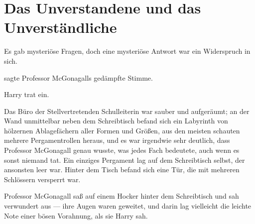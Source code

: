\chapter{Das Unverstandene und das Unverständliche}

\begin{chapterOpeningQuote}
Es gab mysteriöse Fragen, doch eine mysteriöse Antwort war ein Widerspruch in sich.
\end{chapterOpeningQuote}

 sagte Professor McGonagalls gedämpfte Stimme.

\hplettrineextrapara
Harry trat ein.

Das Büro der Stellvertretenden Schulleiterin war sauber und aufgeräumt; an der Wand unmittelbar neben dem Schreibtisch befand sich ein Labyrinth von hölzernen Ablagefächern aller Formen und Größen, aus den meisten schauten mehrere Pergamentrollen heraus, und es war irgendwie sehr deutlich, dass Professor McGonagall genau wusste, was jedes Fach bedeutete, auch wenn es sonst niemand tat. Ein einziges Pergament lag auf dem Schreibtisch selbst, der ansonsten leer war. Hinter dem Tisch befand sich eine Tür, die mit mehreren Schlössern versperrt war.

Professor McGonagall saß auf einem Hocker hinter dem Schreibtisch und sah verwundert aus — ihre Augen waren geweitet, und darin lag vielleicht die leichte Note einer bösen Vorahnung, als sie Harry sah.

